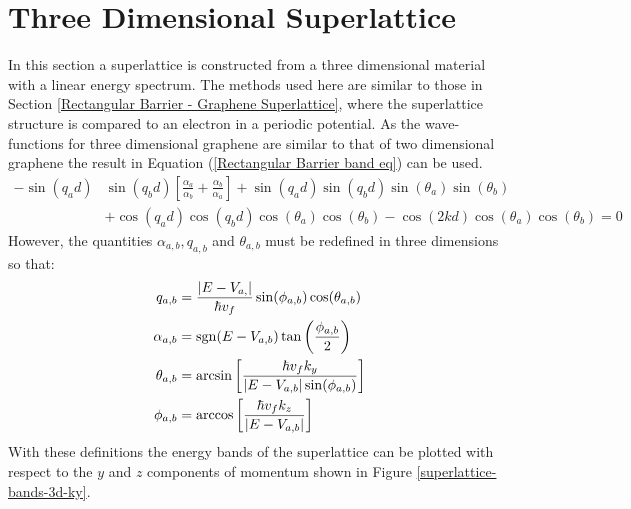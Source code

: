 		\section{Three Dimensional Superlattice}
		\label{Weyl - Three Dimensional Superlattice}
		In this section a superlattice is constructed from a three dimensional material with a linear energy spectrum. The methods used here are similar to those in Section \ref{Rectangular Barrier - Graphene Superlattice}, where the superlattice structure is compared to an electron in a periodic potential. As the wave-functions for three dimensional graphene are similar to that of two dimensional graphene the result in Equation (\ref{Rectangular Barrier band eq}) can be used.
			\begin{align}
				-\sin(q_{a}d)&\sin(q_{b}d)\left[\frac{\alpha_{a}}{\alpha_{b}}+\frac{\alpha_{b}}{\alpha_{a}}\right]+\sin(q_{a}d)\sin(q_{b}d)\sin(\theta_{a})\sin(\theta_{b})\\
				&+\cos(q_{a}d)\cos(q_{b}d)\cos(\theta_{a})\cos(\theta_{b})-\cos(2kd)\cos(\theta_{a})\cos(\theta_{b})=0
				\label{Rectangular Barrier band eq 3d}
			\end{align}
However, the quantities $\alpha_{a,b}, q_{a,b}$ and $\theta_{a,b}$ must be redefined in three dimensions so that:
			\begin{align}
				q_{a,b}&=\frac{|E-V_{a,}|}{\hbar v_{f}}\sin(\phi_{a,b})\cos(\theta_{a,b})\\
				\alpha_{a,b}&=\operatorname{sgn}(E-V_{a,b})\tan\left(\frac{\phi_{a,b}}{2}\right)\\
				\theta_{a,b}&=\arcsin\left[\frac{\hbar v_{f}k_{y}}{|E-V_{a,b}|\sin(\phi_{a,b})}\right]\\
				\phi_{a,b}&=\arccos\left[\frac{\hbar v_{f}k_{z}}{|E-V_{a,b}|}\right]
			\end{align}
			With these definitions the energy bands of the superlattice can be plotted with respect to the $y$ and $z$ components of momentum shown in Figure \ref{superlattice-bands-3d-ky}.
